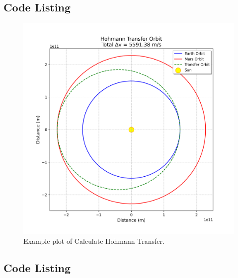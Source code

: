 \documentclass{report}%
\begin{document}
%
\clearpage%
\subsection{Code Listing}%
\label{subsec:CodeListing}%


%
\newpage%
%
%


\begin{figure}[H]%
\centering%
\includegraphics[width=\textwidth]{plots/calculate_hohmann_transfer_plot.png}%
\caption{Example plot of Calculate Hohmann Transfer.}%
\end{figure}

%
\clearpage%
\subsection{Code Listing}%
\label{subsec:CodeListing}%


%
\end{document}
